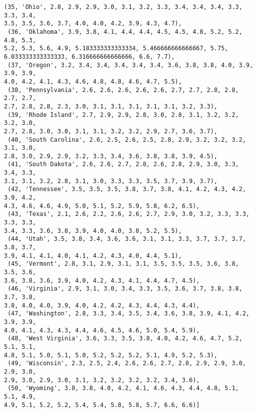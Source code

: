 \documentclass[11pt]{article}
\begin{document}
\begin{tcolorbox}[breakable, size=fbox, boxrule=.5pt, pad at break*=1mm, opacityfill=0]
\begin{Verbatim}[commandchars=\\\{\}]
 (35, 'Ohio', 2.8, 2.9, 2.9, 3.0, 3.1, 3.2, 3.3, 3.4, 3.4, 3.4, 3.3, 3.3, 3.4,
3.5, 3.5, 3.6, 3.7, 4.0, 4.0, 4.2, 3.9, 4.3, 4.7),
 (36, 'Oklahoma', 3.9, 3.8, 4.1, 4.4, 4.4, 4.5, 4.5, 4.8, 5.2, 5.2, 4.8, 5.3,
5.2, 5.3, 5.6, 4.9, 5.183333333333334, 5.466666666666667, 5.75,
6.033333333333333, 6.316666666666666, 6.6, 7.7),
 (37, 'Oregon', 3.2, 3.4, 3.4, 3.4, 3.4, 3.4, 3.6, 3.8, 3.8, 4.0, 3.9, 3.9, 3.9,
4.0, 4.2, 4.1, 4.3, 4.6, 4.8, 4.8, 4.6, 4.7, 5.5),
 (38, 'Pennsylvania', 2.6, 2.6, 2.6, 2.6, 2.6, 2.7, 2.7, 2.8, 2.8, 2.7, 2.7,
2.7, 2.8, 2.8, 2.3, 3.0, 3.1, 3.1, 3.1, 3.1, 3.1, 3.2, 3.3),
 (39, 'Rhode Island', 2.7, 2.9, 2.9, 2.8, 3.0, 2.8, 3.1, 3.2, 3.2, 3.2, 3.0,
2.7, 2.8, 3.0, 3.0, 3.1, 3.1, 3.2, 3.2, 2.9, 2.7, 3.6, 3.7),
 (40, 'South Carolina', 2.6, 2.5, 2.6, 2.5, 2.8, 2.9, 3.2, 3.2, 3.2, 3.1, 3.0,
2.8, 3.0, 2.9, 2.9, 3.2, 3.3, 3.4, 3.6, 3.8, 3.8, 3.9, 4.5),
 (41, 'South Dakota', 2.6, 2.6, 2.7, 2.8, 2.6, 2.8, 2.9, 3.0, 3.3, 3.4, 3.3,
3.1, 3.1, 3.2, 2.8, 3.1, 3.0, 3.3, 3.3, 3.5, 3.7, 3.9, 3.7),
 (42, 'Tennessee', 3.5, 3.5, 3.5, 3.8, 3.7, 3.8, 4.1, 4.2, 4.3, 4.2, 3.9, 4.2,
4.3, 4.6, 4.6, 4.9, 5.0, 5.1, 5.2, 5.9, 5.8, 6.2, 6.5),
 (43, 'Texas', 2.1, 2.6, 2.2, 2.6, 2.6, 2.7, 2.9, 3.0, 3.2, 3.3, 3.3, 3.3, 3.3,
3.4, 3.3, 3.6, 3.8, 3.9, 4.0, 4.0, 3.8, 5.2, 5.5),
 (44, 'Utah', 3.5, 3.8, 3.4, 3.6, 3.6, 3.1, 3.1, 3.3, 3.7, 3.7, 3.7, 3.8, 3.7,
3.9, 4.1, 4.1, 4.0, 4.1, 4.2, 4.3, 4.0, 4.4, 5.1),
 (45, 'Vermont', 2.8, 3.1, 2.9, 3.1, 3.1, 3.5, 3.5, 3.5, 3.6, 3.8, 3.5, 3.6,
3.6, 3.8, 3.6, 3.9, 4.0, 4.2, 4.3, 4.1, 4.4, 4.7, 4.5),
 (46, 'Virginia', 2.9, 3.1, 3.0, 3.4, 3.3, 3.5, 3.6, 3.7, 3.8, 3.8, 3.7, 3.8,
3.8, 4.0, 4.0, 3.9, 4.0, 4.2, 4.2, 4.3, 4.4, 4.3, 4.4),
 (47, 'Washington', 2.8, 3.3, 3.4, 3.5, 3.4, 3.6, 3.8, 3.9, 4.1, 4.2, 3.9, 3.9,
4.0, 4.1, 4.3, 4.3, 4.4, 4.6, 4.5, 4.6, 5.0, 5.4, 5.9),
 (48, 'West Virginia', 3.6, 3.3, 3.5, 3.8, 4.0, 4.2, 4.6, 4.7, 5.2, 5.1, 5.1,
4.8, 5.1, 5.0, 5.1, 5.0, 5.2, 5.2, 5.2, 5.1, 4.9, 5.2, 5.3),
 (49, 'Wisconsin', 2.3, 2.5, 2.4, 2.6, 2.6, 2.7, 2.8, 2.9, 2.9, 3.0, 2.9, 3.0,
2.9, 3.0, 2.9, 3.0, 3.1, 3.2, 3.2, 3.2, 3.2, 3.4, 3.6),
 (50, 'Wyoming', 3.8, 3.8, 4.0, 4.2, 4.1, 4.6, 4.3, 4.4, 4.8, 5.1, 5.1, 4.9,
4.9, 5.1, 5.2, 5.2, 5.4, 5.4, 5.8, 5.8, 5.7, 6.6, 6.6)]
\end{Verbatim}
\end{tcolorbox}
        
\end{document}
